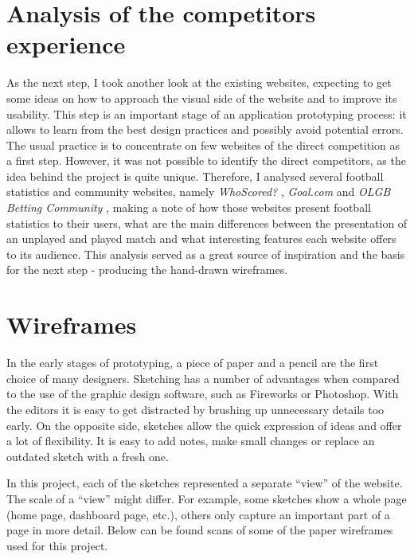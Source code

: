 \section{Analysis of the competitors experience}
\label{sec:competitors_prototype}
As the next step, I took another look at the existing websites, expecting to get some ideas on how to approach the visual side of the website and to improve its usability. This step is an important stage of an application prototyping process: it allows to learn from the best design practices and possibly avoid potential errors. The usual practice is to concentrate on few websites of the direct competition as a first step. However, it was not possible to identify the direct competitors, as the idea behind the project is quite unique. Therefore, I analysed several football statistics and community websites, namely \emph{WhoScored?} \citep{source:whoscored}, \emph{Goal.com} \citep{source:goal} and \emph{OLGB Betting Community} \citep{source:olgb}, making a note of how those websites present football statistics to their users, what are the main differences between the presentation of an unplayed and played match and what interesting features each website offers to its audience. This analysis served as a great source of inspiration and the basis for the next step - producing the hand-drawn wireframes.

\section{Wireframes}
\label{sec:wireframes_design}
In the early stages of prototyping, a piece of paper and a pencil are the first choice of many designers. Sketching has a number of advantages when compared to the use of the graphic design software, such as Fireworks or Photoshop. With the editors it is easy to get distracted by brushing up unnecessary details too early. On the opposite side, sketches allow the quick expression of ideas and offer a lot of flexibility. It is easy to add notes, make small changes or replace an outdated sketch with a fresh one.

In this project, each of the sketches represented a separate “view” of the website. The scale of a “view” might differ. For example, some sketches show a whole page (home page, dashboard page, etc.), others only capture an important part of a page in more detail.  Below can be found scans of some of the paper wireframes used for this project.

